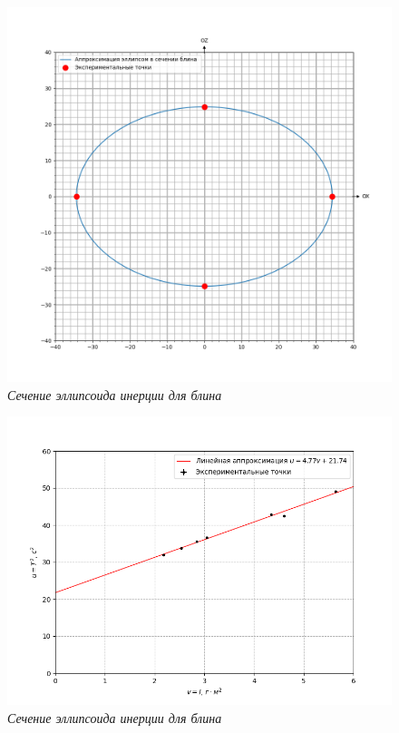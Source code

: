 \documentclass[a4paper,12pt]{article}
\begin{document}
\begin{figure}[h!]
    \includegraphics[width=1\textwidth]{blin.png}
    \caption{\textit{Сечение эллипсоида инерции для блина}}
    \label{blin-ell}
\end{figure}

\begin{figure}[h!]
    \includegraphics[width=1\textwidth]{graph.png}
    \caption{\textit{Сечение эллипсоида инерции для блина}}
    \label{T2I}
\end{figure}
\end{document}
